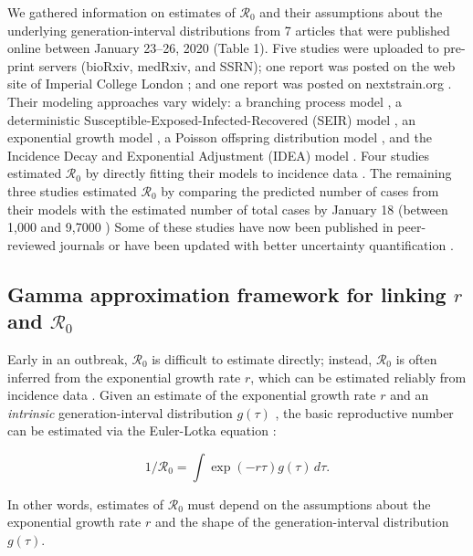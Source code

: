 \documentclass[12pt]{article}
\newcommand{\Ro}{\ensuremath{{\mathcal R}_{0}}\xspace}
\begin{document}
We gathered information on estimates of \Ro and their assumptions about the underlying generation-interval distributions from 7 articles that were published online between January 23--26, 2020 (Table 1).
Five studies \citep{liuncov, majumderncov, readncov, riouncov, zhaoncov} were uploaded to pre-print servers (bioRxiv, medRxiv, and SSRN); one report was posted on the web site of Imperial College London \citep{imaincov}; and one report was posted on nextstrain.org \citep{bedfordncov}.
Their modeling approaches vary widely: a branching process model \citep{bedfordncov, imaincov, riouncov}, a deterministic Susceptible-Exposed-Infected-Recovered (SEIR) model \citep{readncov}, an exponential growth model \citep{zhaoncov}, a Poisson offspring distribution model \citep{liuncov}, and the Incidence Decay and Exponential Adjustment (IDEA) model \citep{majumderncov}.
Four studies estimated \Ro by directly fitting their models to incidence data \citep{readncov, zhaoncov, liuncov, majumderncov}.
The remaining three studies estimated \Ro by comparing the predicted number of cases from their models with the estimated number of total cases by January 18 (between 1,000 and 9,7000 \citep{imaincov0})
Some of these studies have now been published in peer-reviewed journals \citep{riou2020pattern, zhao2020preliminary} or have been updated with better uncertainty quantification \citep{readncov2}.

\subsection{Gamma approximation framework for linking $r$ and $\Ro$}

Early in an outbreak, \Ro is difficult to estimate directly;
instead, \Ro is often inferred from the exponential growth rate $r$, which can be estimated reliably from incidence data \citep{ma2014estimating}.
Given an estimate of the exponential growth rate $r$ and an \emph{intrinsic} generation-interval distribution $g(\tau)$ \citep{champredon2015intrinsic}, the basic reproductive
number can be estimated via the Euler-Lotka equation \citep{wallinga2007generation}:
\begin{linenomath*}
\begin{equation}
1/\Ro = \int \exp(-r\tau) g(\tau) \, d\tau.
\label{eq:euler}
\end{equation}
\end{linenomath*}
In other words, estimates of \Ro must
depend on the assumptions about the
exponential growth rate $r$ and the shape of the generation-interval distribution $g(\tau)$.
\end{document}
